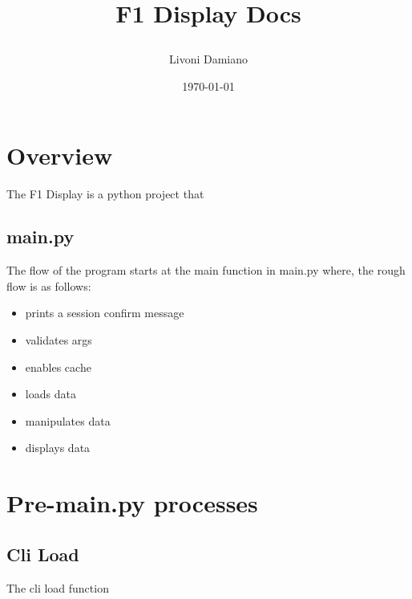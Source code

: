 \documentclass[11pt]{article}
\title{
  \begin{center}
    \Huge{\textbf{F1 Display Docs}}
  \end{center}}
\author{Livoni Damiano}
\date{\today}
\begin{document}
  \maketitle
  \pagebreak

  \tableofcontents
  \pagebreak

  \section{Overview}
  The F1 Display is a python project that 
  \subsection{main.py}
    The flow of the program starts at the main function in main.py where, the rough flow is as follows:
    \begin{itemize}
      \item prints a session confirm message
      \item validates args
      \item enables cache
      \item loads data
      \item manipulates data
      \item displays data
    \end{itemize}

  \section{Pre-main.py processes}
    \subsection{Cli Load}
      The cli load function 
\end{document}
